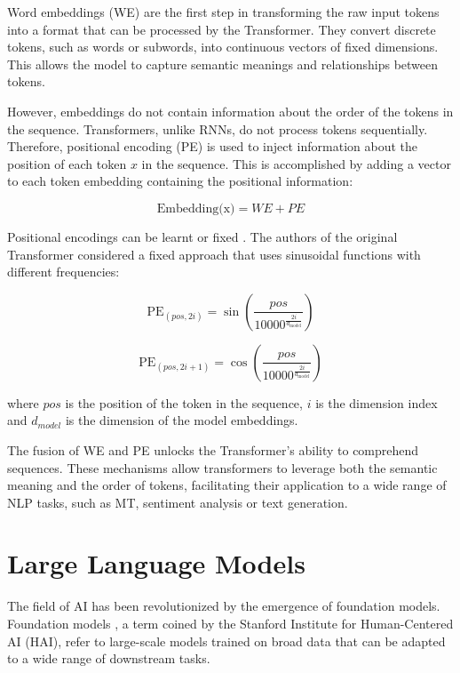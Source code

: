 \documentclass[11pt,english,listoffigures,listoftables]{tfgetsinf}
\begin{document}
Word embeddings (WE) are the first step in transforming the raw input tokens into a format that can be processed by the Transformer. They convert discrete tokens, such as words or subwords, into continuous vectors of fixed dimensions. This allows the model to capture semantic meanings and relationships between tokens. 

However, embeddings do not contain information about the order of the tokens in the sequence. Transformers, unlike RNNs, do not process tokens sequentially. Therefore, positional encoding (PE) is used to inject information about the position of each token $x$ in the sequence. This is accomplished by adding a vector to each token embedding containing the positional information:

\begin{equation}
    \text{Embedding(x)} = WE + PE
\end{equation}

Positional encodings can be learnt or fixed \cite{gehring2017convolutional}. The authors of the original Transformer considered a fixed approach that uses sinusoidal functions with different frequencies:

\begin{equation}
    \text{PE}_{(pos, 2i)} = \sin\left(\frac{pos}{10000^{\frac{2i}{d_{\text{model}}}}}\right)
\end{equation}

\begin{equation}
    \text{PE}_{(pos, 2i+1)} = \cos\left(\frac{pos}{10000^{\frac{2i}{d_{\text{model}}}}}\right)
\end{equation}

where \(pos\) is the position of the token in the sequence, \(i\) is the dimension index and \(d_{model}\) is the dimension of the model embeddings.

The fusion of WE and PE unlocks the Transformer's ability to comprehend sequences. These mechanisms allow transformers to leverage both the semantic meaning and the order of tokens, facilitating their application to a wide range of NLP tasks, such as MT, sentiment analysis or text generation.

\section{Large Language Models}

The field of AI has been revolutionized by the emergence of foundation models. Foundation models \cite{bommasani_foundation}, a term coined by the Stanford Institute for Human-Centered AI (HAI), refer to large-scale models trained on broad data that can be adapted to a wide range of downstream tasks. 
\end{document}
